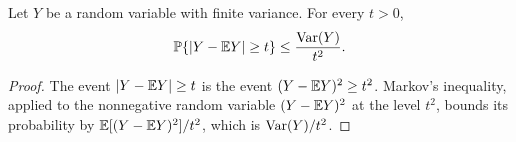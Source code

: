 \begin{lemma}
\label{lem:chebyshev}
Let $Y$ be a random variable with finite variance.
For every $t > 0$,
\[
  \mathbb{P}\{|Y - \mathbb{E} Y| \ge t\} \le \frac{\operatorname{Var}(Y)}{t^2}.
\]
\end{lemma}

\begin{proof}
The event $|Y - \mathbb{E} Y| \ge t$ is the event $(Y - \mathbb{E} Y)^2 \ge t^2$.
Markov's inequality, applied to the nonnegative random variable $(Y - \mathbb{E} Y)^2$ at the level $t^2$, bounds its probability by $\mathbb{E}[(Y - \mathbb{E} Y)^2] / t^2$, which is $\operatorname{Var}(Y) / t^2$.
\end{proof}
